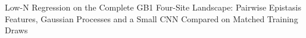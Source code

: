 Low-N Regression on the Complete GB1 Four-Site Landscape: Pairwise Epistasis Features, Gaussian Processes and a Small CNN Compared on Matched Training Draws
